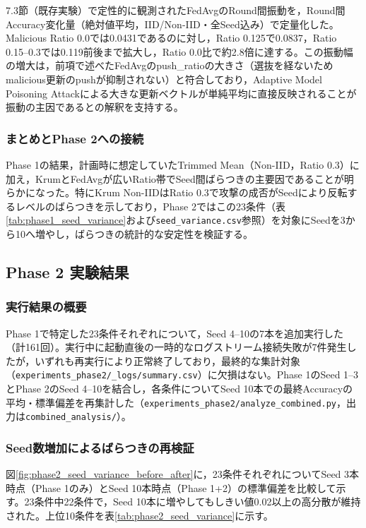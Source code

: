 \documentclass[a4j, twocolumn, dvipdfmx]{jsarticle}  %
\begin{document}
7.3節（既存実験）で定性的に観測されたFedAvgのRound間振動を，Round間Accuracy変化量（絶対値平均，IID/Non-IID・全Seed込み）で定量化した。Malicious Ratio 0.0では0.0431であるのに対し，Ratio 0.125で0.0837，Ratio 0.15--0.3では0.119前後まで拡大し，Ratio 0.0比で約2.8倍に達する。この振動幅の増大は，前項で述べたFedAvgのpush\_ratioの大きさ（選抜を経ないためmalicious更新のpushが抑制されない）と符合しており，Adaptive Model Poisoning Attackによる大きな更新ベクトルが単純平均に直接反映されることが振動の主因であるとの解釈を支持する。

\subsubsection{まとめとPhase 2への接続}

Phase 1の結果，計画時に想定していたTrimmed Mean（Non-IID，Ratio 0.3）に加え，KrumとFedAvgが広いRatio帯でSeed間ばらつきの主要因であることが明らかになった。特にKrum Non-IIDはRatio 0.3で攻撃の成否がSeedにより反転するレベルのばらつきを示しており，Phase 2ではこの23条件（表\ref{tab:phase1_seed_variance}および\texttt{seed\_variance.csv}参照）を対象にSeedを3から10へ増やし，ばらつきの統計的な安定性を検証する。

\subsection{Phase 2 実験結果}

\subsubsection{実行結果の概要}

Phase 1で特定した23条件それぞれについて，Seed 4--10の7本を追加実行した（計161回）。実行中に起動直後の一時的なログストリーム接続失敗が7件発生したが，いずれも再実行により正常終了しており，最終的な集計対象（\texttt{experiments\_phase2/\_logs/summary.csv}）に欠損はない。Phase 1のSeed 1--3とPhase 2のSeed 4--10を結合し，各条件についてSeed 10本での最終Accuracyの平均・標準偏差を再集計した（\texttt{experiments\_phase2/analyze\_combined.py}，出力は\texttt{combined\_analysis/}）。

\subsubsection{Seed数増加によるばらつきの再検証}

図\ref{fig:phase2_seed_variance_before_after}に，23条件それぞれについてSeed 3本時点（Phase 1のみ）とSeed 10本時点（Phase 1+2）の標準偏差を比較して示す。23条件中22条件で，Seed 10本に増やしてもしきい値0.02以上の高分散が維持された。上位10条件を表\ref{tab:phase2_seed_variance}に示す。
\end{document}
